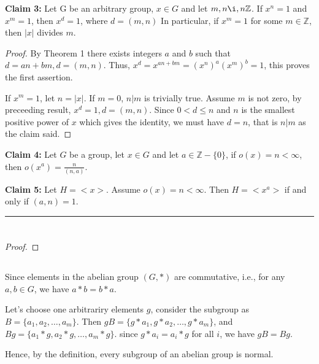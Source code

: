 \documentclass[12pt]{article}
\begin{document}
\noindent \textbf{Claim 3: } Let G be an arbitrary group, $x\in G$ and let $m,n\i,n\mathbb{Z}$. If $x^n = 1$ and $x^m = 1$, then $x^d = 1$, where $d=(m,n)$ In particular, if $x^m = 1$ for some $m\in\mathbb{Z}$, then $|x|$ divides $m$.
\begin{proof}
By Theorem 1 there exists integers $a$ and $b$ such that $d=an+bm,d=(m,n)$. Thus, $x^d=x^{an+bm}=(x^n)^a(x^m)^b=1$, this proves the first assertion.

If $x^m=1$, let $n=|x|$. If $m=0$, $n|m$ is trivially true. Assume $m$ is not zero, by preceeding result, $x^d=1,d=(m,n)$. Since $0< d\le n$ and $n$ is the smallest positive power of $x$ which gives the identity, we must have $d=n$, that is $n|m$ as the claim said.
\end{proof}
\noindent \textbf{Claim 4:} Let $G$ be a group, let $x\in G$ and let $a\in\mathbb{Z}-\{0\}$, if $o(x)=n<\infty$, then $o(x^a)=\frac{n}{(n,a)}$. 

\noindent \textbf{Claim 5:} Let $H=<x>$. Assume $o(x)=n<\infty$. Then $H=<x^a>$ if and only if $(a,n)=1$.

\noindent\rule{\textwidth}{1pt}

\subsection{} %
\subsection{} %












\newpage
\section{} %
\subsection{} %
\begin{proof}
    
\end{proof}
\subsection{} %
\subsection{} %
Since elements in the abelian group $(G,*)$ are commutative, i.e., for any $a,b\in G$, we have $a*b=b*a$.

Let's choose one arbitrariry elements $g$, consider the subgroup as $B=\{a_1,a_2,\dots,a_m\}$. Then $gB=\{g*a_1,g*a_2,\dots,g*a_m\}$, and $Bg=\{a_1*g,a_2*g,\dots,a_m*g\}$. since $g*a_i=a_i*g$ for all $i$, we have $gB=Bg$.

Hence, by the definition, every subgroup of an abelian group is normal.
\subsection{} %
\end{document}
